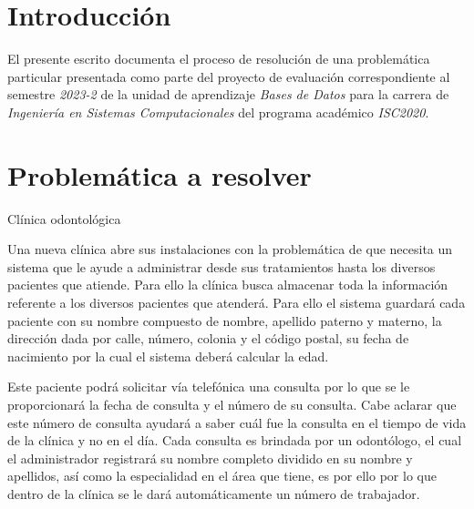 \documentclass[a4paper,12pt]{article}
\begin{document}
\tableofcontents

\newpage

\justifying

\section{Introducción}

El presente escrito documenta el proceso de resolución de una problemática particular presentada como parte del proyecto de evaluación correspondiente al semestre \emph{2023-2} de la unidad de aprendizaje \emph{Bases de Datos} para la carrera de \emph{Ingeniería en Sistemas Computacionales} del programa académico \emph{ISC2020}.

\section{Problemática a resolver}

\begin{large}Clínica odontológica\end{large}

\vspace{0.5cm}

Una nueva clínica abre sus instalaciones con la problemática de que necesita un sistema que le ayude a administrar desde sus tratamientos hasta los diversos pacientes que atiende. Para ello la clínica busca almacenar toda la información referente a los diversos pacientes que atenderá. Para ello el sistema guardará cada paciente con su nombre compuesto de nombre, apellido paterno y materno, la dirección dada por calle, número, colonia y el código postal, su fecha de nacimiento por la cual el sistema deberá calcular la edad.\par

\vspace{0.5cm}

Este paciente podrá solicitar vía telefónica una consulta por lo que se le proporcionará la fecha de consulta y el número de su consulta. Cabe aclarar que este número de consulta ayudará a saber cuál fue la consulta en el tiempo de vida de la clínica y no en el día. Cada consulta es brindada por un odontólogo, el cual el administrador registrará su nombre completo dividido en su nombre y apellidos, así como la especialidad en el área que tiene, es por ello por lo que dentro de la clínica se le dará automáticamente un número de trabajador.\par
\end{document}
